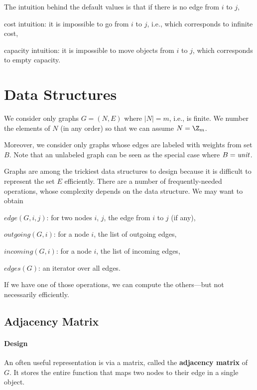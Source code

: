The intuition behind the default values is that if there is no edge from $i$ to $j$,
\begin{compactitem}
 \item cost intuition: it is impossible to go from $i$ to $j$, i.e., which corresponds to infinite cost,
 \item capacity intuition: it is impossible to move objects from $i$ to $j$, which corresponds to empty capacity.
\end{compactitem}

\section{Data Structures}

We consider only graphs $G=(N,E)$ where $|N|=m$, i.e., is finite.
We number the elements of $N$ (in any order) so that we can assume $N=\Z_m$.

Moreover, we consider only graphs whose edges are labeled with weights from set $B$.
Note that an unlabeled graph can be seen as the special case where $B=\mathit{unit}$.

Graphs are among the trickiest data structures to design because it is difficult to represent the set $E$ efficiently.
There are a number of frequently-needed operations, whose complexity depends on the data structure.
We may want to obtain
\begin{compactitem}
 \item $edge(G,i,j)$: for two nodes $i$, $j$, the edge from $i$ to $j$ (if any),
 \item $outgoing(G,i)$: for a node $i$, the list of outgoing edges,
 \item $incoming(G,i)$: for a node $i$, the list of incoming edges,
 \item $edges(G)$: an iterator over all edges.
\end{compactitem}

If we have one of those operations, we can compute the others---but not necessarily efficiently.

\subsection{Adjacency Matrix}

\paragraph{Design}
An often useful representation is via a matrix, called the \textbf{adjacency matrix} of $G$.
It stores the entire function that maps two nodes to their edge in a single object.

